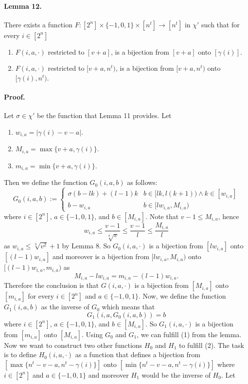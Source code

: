 \paragraph{Lemma 12.} There exists a function $F:[2^n]\times\{-1,0,1\}\times[n^t]\to[n^t]$ in $\chi'$ such that for every $i\in[2^n]$
\begin{enumerate}
\item $F(i,a,\cdot)$ restricted to $[v+a]$, is a bijection from $[v+a]$ onto $[\gamma(i)]$.
\item $F(i,a,\cdot)$ restricted to $[v+a,n^t)$, is a bijection from $[v+a,n^t)$ onto $[\gamma(i),n^t)$.
\end{enumerate}
\paragraph{Proof.} Let $\sigma\in\chi'$ be the function that Lemma 11 provides. Let
\begin{enumerate}
\item $w_{i,a}=|\gamma(i)-v-a|$.
\item $M_{i,a}=\max\{v+a,\gamma(i)\}$.
\item $m_{i,a}=\min\{v+a,\gamma(i)\}$.
\end{enumerate}
Then we define the function $G_0(i,a,b)$ as follows:
\[G_0(i,a,b):=\begin{cases}\sigma(b-lk)+(l-1)k&b\in[lk,l(k+1))\wedge k\in[w_{i,a}]\\b-w_{i,a}&b\in[lw_{i,a},M_{i,a})\end{cases}\]
where $i\in[2^n]$, $a\in\{-1,0,1\}$, and $b\in[M_{i,a}]$.
Note that $v-1\leq M_{i,a}$, hence
\[w_{i,a}\leq\frac{v-1}{\sqrt[4]v}\leq\frac{v-1}l\leq\frac{M_{i,a}}l\]
as $w_{i,a}\leq\sqrt[3]{v^2}+1$ by Lemma 8. So $G_0(i,a,\cdot)$ is a bijection from $[lw_{i,a}]$ onto $[(l-1)w_{i,a}]$ and moreover is a bijection from $[lw_{i,a},M_{i,a})$ onto $[(l-1)w_{i,a},m_{i,a})$ as
\[M_{i,a}-lw_{i,a}=m_{i,a}-(l-1)w_{i,a}.\]
Therefore the conclusion is that $G(i,a,\cdot)$ is a bijection from $[M_{i,a}]$ onto $[m_{i,a}]$ for every $i\in[2^n]$ and $a\in\{-1,0,1\}$. Now, we define the function $G_1(i,a,b)$ as the inverse of $G_0$ which means that
\[G_1(i,a,G_0(i,a,b))=b\]
where $i\in[2^n]$, $a\in\{-1,0,1\}$, and $b\in[M_{i,a}]$. So $G_1(i,a,\cdot)$ is a bijection from $[m_{i,a}]$ onto $[M_{i,a}]$.
Using $G_0$ and $G_1$, we can fulfill (1) from the lemma. Now we want to construct two other functions $H_0$ and $H_1$ to fulfill (2).
The task is to define $H_0(i,a,\cdot)$ as a function that defines a bijection from $[\max\{n^t-v-a,n^t-\gamma(i)\}]$ onto $[\min\{n^t-v-a,n^t-\gamma(i)\}]$ where $i\in[2^n]$ and $a\in\{-1,0,1\}$ and moreover $H_1$ would be the inverse of $H_0$. Let
